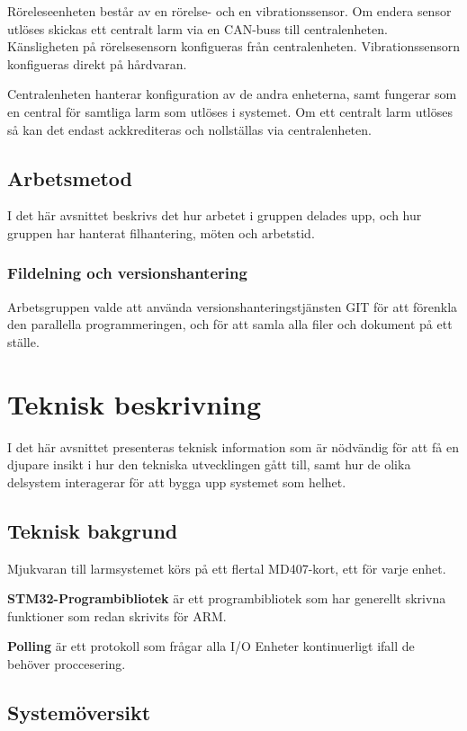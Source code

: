 \documentclass{article}
\begin{document}
Röreleseenheten består av en rörelse- och en vibrationssensor. Om endera sensor
utlöses skickas ett centralt larm via en CAN-buss till centralenheten. Känsligheten
på rörelsesensorn konfigueras från centralenheten. Vibrationssensorn konfigueras direkt på hårdvaran.

Centralenheten hanterar konfiguration av de andra enheterna, samt fungerar som en
central för samtliga larm som utlöses i systemet. Om ett centralt larm utlöses så
kan det endast ackkrediteras och nollställas via centralenheten.

\subsection{Arbetsmetod} %
I det här avsnittet beskrivs det hur arbetet i gruppen delades upp, och hur gruppen har hanterat
filhantering, möten och arbetstid.

\subsubsection{Fildelning och versionshantering}
Arbetsgruppen valde att använda versionshanteringstjänsten GIT för att förenkla den parallella programmeringen, och för att samla alla filer och dokument på ett ställe.


\section{Teknisk beskrivning} %
I det här avsnittet presenteras teknisk information som är nödvändig för att få en djupare insikt i hur den tekniska utvecklingen gått till, samt hur de olika delsystem interagerar för att bygga upp systemet som helhet.
\subsection{Teknisk bakgrund}
Mjukvaran till larmsystemet körs på ett flertal MD407-kort, ett för varje enhet.

\textbf{STM32-Programbibliotek}\cite{stm} är ett programbibliotek som har generellt skrivna funktioner som 
redan skrivits för ARM.

\textbf{Polling} är ett protokoll som frågar alla I/O Enheter kontinuerligt ifall de behöver proccesering.
\subsection{Systemöversikt}
\end{document}
